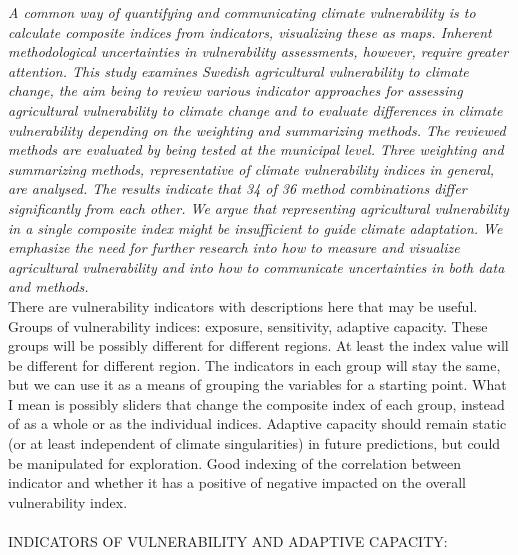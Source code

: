 \textit{A common way of quantifying and communicating climate vulnerability is to calculate composite indices from indicators, visualizing these as maps. Inherent methodological uncertainties in vulnerability assessments, however, require greater attention. This study examines Swedish agricultural vulnerability to climate change, the aim being to review various indicator approaches for assessing agricultural vulnerability to climate change and to evaluate differences in climate vulnerability depending on the weighting and summarizing methods. The reviewed methods are evaluated by being tested at the municipal level. Three weighting and summarizing methods, representative of climate vulnerability indices in general, are analysed. The results indicate that 34 of 36 method combinations differ significantly from  each other. We argue that representing agricultural vulnerability in a single composite index might be insufficient to guide climate adaptation. We emphasize the need for further research into how to measure and visualize agricultural vulnerability and into how to communicate uncertainties in both data and methods.}\\
There are vulnerability indicators with descriptions here that may be useful. Groups of vulnerability indices: exposure, sensitivity, adaptive capacity. These groups will be possibly different for different regions. At least the index value will be different for different region. The indicators in each group will stay the same, but we can use it as a means of grouping the variables for a starting point. What I mean is possibly sliders that change the composite index of each group, instead of as a whole or as the individual indices. Adaptive capacity should remain static (or at least independent of climate singularities) in future predictions, but could be manipulated for exploration. Good indexing of the correlation between indicator and whether it has a positive of negative impacted on the overall vulnerability index.\\
\\
INDICATORS OF VULNERABILITY AND ADAPTIVE CAPACITY: ~\cite{hinkel2011indicators}\\
